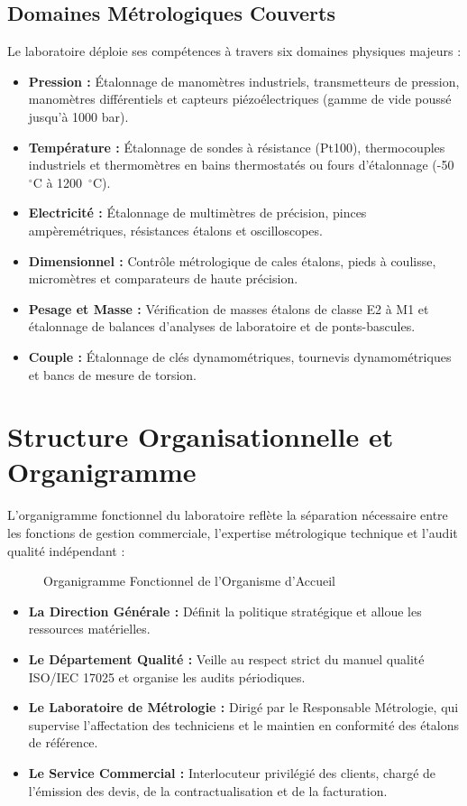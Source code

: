 \documentclass{bts-report}
\begin{document}
\subsection{Domaines M\'etrologiques Couverts}
Le laboratoire d\'eploie ses comp\'etences \`a travers six domaines physiques majeurs :
\begin{itemize}
  \item \textbf{Pression :} \'Etalonnage de manom\`etres industriels, transmetteurs de pression, manom\`etres diff\'erentiels et capteurs pi\'ezo\'electriques (gamme de vide pouss\'e jusqu'\`a 1000 bar).
  \item \textbf{Temp\'erature :} \'Etalonnage de sondes \`a r\'esistance (Pt100), thermocouples industriels et thermom\`etres en bains thermostat\'es ou fours d'\'etalonnage (-50~$^\circ$C \`a 1200~$^\circ$C).
  \item \textbf{Electricit\'e :} \'Etalonnage de multim\`etres de pr\'ecision, pinces amp\`erem\'etriques, r\'esistances \'etalons et oscilloscopes.
  \item \textbf{Dimensionnel :} Contr\^ole m\'etrologique de cales \'etalons, pieds \`a coulisse, microm\`etres et comparateurs de haute pr\'ecision.
  \item \textbf{Pesage et Masse :} V\'erification de masses \'etalons de classe E2 \`a M1 et \'etalonnage de balances d'analyses de laboratoire et de ponts-bascules.
  \item \textbf{Couple :} \'Etalonnage de cl\'es dynamom\'etriques, tournevis dynamom\'etriques et bancs de mesure de torsion.
\end{itemize}

\section{Structure Organisationnelle et Organigramme}
L'organigramme fonctionnel du laboratoire refl\`ete la s\'eparation n\'ecessaire entre les fonctions de gestion commerciale, l'expertise m\'etrologique technique et l'audit qualit\'e ind\'ependant :

\begin{figure}[H]
  \centering
  
  \caption{Organigramme Fonctionnel de l'Organisme d'Accueil}
  \label{fig:org-chart}
\end{figure}

\begin{itemize}
  \item \textbf{La Direction G\'en\'erale :} D\'efinit la politique strat\'egique et alloue les ressources mat\'erielles.
  \item \textbf{Le D\'epartement Qualit\'e :} Veille au respect strict du manuel qualit\'e ISO/IEC 17025 et organise les audits p\'eriodiques.
  \item \textbf{Le Laboratoire de M\'etrologie :} Dirig\'e par le Responsable M\'etrologie, qui supervise l'affectation des techniciens et le maintien en conformit\'e des \'etalons de r\'ef\'erence.
  \item \textbf{Le Service Commercial :} Interlocuteur privil\'egi\'e des clients, charg\'e de l'\'emission des devis, de la contractualisation et de la facturation.
\end{itemize}
\end{document}
